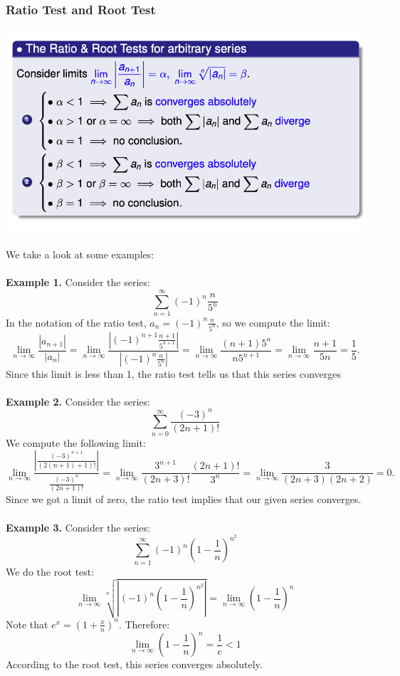 \documentclass{article}
\begin{document}
\subsubsection{Ratio Test and Root Test}
\begin{center}
        \includegraphics[scale = 0.7]{ratio - root test.png}
    \end{center} 
We take a look at some examples: \\ \\
\textbf{Example 1.} Consider the series: 
$$\sum_{n=1}^{\infty} (-1)^n \frac{n}{5^n}$$
In the notation of the ratio test, $a_n = (-1)^n \frac{n}{5^n}$, so we compute the limit: 
$$\lim_{n \to \infty} \frac{|a_{n+1}|}{|a_n|} = \lim_{n \to \infty} \frac{\left| (-1)^{n+1} \frac{ n+1}{5^{n+1}}\right|}{\left|(-1)^n \frac{n}{5^n}\right|} = \lim_{n \to \infty} \frac{(n + 1)5^n}{n5^{n+1}} = \lim_{n \to \infty} \frac{n + 1}{5n} = \frac{1}{5}.$$
Since this limit is less than 1, the ratio test tells us that this series converges
\\ \\
\textbf{Example 2.} Consider the series: 
$$\sum_{n=0}^{\infty} \frac{(-3)^n}{(2n+1)!}$$
We compute the following limit:
$$\lim_{n \to \infty} \frac{\left| \frac{(-3)^{n+1}}{(2(n+1)+1)!} \right|}{\frac{(-3)^n}{(2n+1)!}} = \lim_{n \to \infty} \frac{3^{n+1}}{(2n + 3)!} \frac{(2n+1)!}{3^n} = \lim_{n \to \infty} \frac{3}{(2n + 3)(2n + 2)} = 0.$$
Since we got a limit of zero, the ratio test implies that our given series converges. \\ \\
\textbf{Example 3.} Consider the series:
$$ \sum_{n=1}^{\infty} (-1)^n \left(1-\frac{1}{n}\right)^{n^2}$$
We do the root test: 
   $$ \lim_{n\to\infty} \sqrt[n]{\left|(-1)^n \left(1-\frac{1}{n} \right)^{n^2} \right|}  = \lim_{n\to\infty} \left(1-\frac{1}{n}\right)^n$$
Note that $e^x = (1 + \frac{x}{n})^n$. Therefore:
$$ \lim_{n\to\infty} \left(1-\frac{1}{n}\right)^n = \frac{1}{e} < 1$$
According to the root test, this series converges absolutely. 
\end{document}
